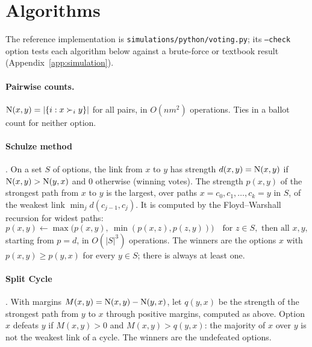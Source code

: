 \section{Algorithms}\label{app:algorithms}

The reference implementation is \texttt{simulations/python/voting.py}; its \texttt{--check} option tests
each algorithm below against a brute-force or textbook result (Appendix~\ref{app:simulation}).

\paragraph{Pairwise counts.} $\operatorname{N}(x,y) = |\{i : x \succ_i y\}|$ for all pairs, in $O(nm^2)$ operations.
Ties in a ballot count for neither option.

\paragraph{Schulze method} \citep{Schulze2011}. On a set $S$ of options, the link from $x$ to $y$ has
strength $d(x,y) = \operatorname{N}(x,y)$ if $\operatorname{N}(x,y) > \operatorname{N}(y,x)$ and $0$ otherwise (winning votes). The strength
$p(x,y)$ of the strongest path from $x$ to $y$ is the largest, over paths $x = c_0, c_1, \dots, c_k = y$ in
$S$, of the weakest link $\min_j d(c_{j-1}, c_j)$. It is computed by the Floyd--Warshall recursion for
widest paths:
\begin{equation*}
p(x,y) \gets \max\bigl(p(x,y),\ \min(p(x,z), p(z,y))\bigr) \quad \text{for } z \in S, \text{ then all } x, y,
\end{equation*}
starting from $p = d$, in $O(|S|^3)$ operations. The winners are the options $x$ with
$p(x,y) \ge p(y,x)$ for every $y \in S$; there is always at least one.

\paragraph{Split Cycle} \citep{HollidayPacuit2023splitcycle}. With margins $M(x,y) = \operatorname{N}(x,y) -
\operatorname{N}(y,x)$, let $q(y,x)$ be the strength of the strongest path from $y$ to $x$ through positive margins,
computed as above. Option $x$ defeats $y$ if $M(x,y) > 0$ and $M(x,y) > q(y,x)$: the majority of $x$ over
$y$ is not the weakest link of a cycle. The winners are the undefeated options.

